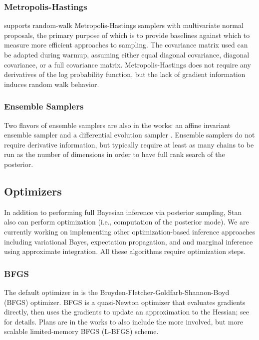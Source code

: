 \documentclass[article]{jss}
\begin{document}
\subsubsection{Metropolis-Hastings}

 supports random-walk Metropolis-Hastings samplers with
multivariate normal proposals, the primary purpose of which is to
provide baselines against which to measure more efficient approaches
to sampling.  The covariance matrix used can be adapted during warmup,
assuming either equal diagonal covariance, diagonal covariance, or a
full covariance matrix.  Metropolis-Hastings does not require any
derivatives of the log probability function, but the lack of gradient
information induces random walk behavior.


\subsubsection{Ensemble Samplers}

Two flavors of ensemble samplers are also in the works: an affine invariant
ensemble sampler \citep{GoodmanWeare:2010} and a differential
evolution sampler \cite{TerBraak:2006}.  Ensemble samplers do not
require derivative information, but typically require at least as many
chains to be run as the number of dimensions in order to have full
rank search of the posterior.

\subsection{Optimizers}

In addition to performing full Bayesian inference via posterior
sampling, Stan also can perform optimization (i.e., computation of the
posterior mode).  We are currently working on implementing other
optimization-based inference approaches including variational Bayes,
expectation propagation, and and marginal inference using approximate
integration.  All these algorithms require optimization steps.

\subsubsection{BFGS}

The default optimizer in  is the
Broyden-Fletcher-Goldfarb-Shannon-Boyd (BFGS) optimizer.  BFGS is a
quasi-Newton optimizer that evaluates gradients directly, then uses
the gradients to update an approximation to the Hessian; see
\citep{NocedalWright:2006} for details.  Plans are in the works to
also include the more involved, but more scalable limited-memory BFGS
(L-BFGS) scheme.
\end{document}
